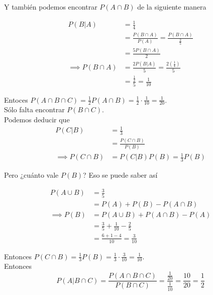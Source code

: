 \documentclass[12pt,a4paper]{report}
\begin{document}
\begin{enumerate}
{\begin{enumerate}[label=\alph*) ]
{			Y también podemos encontrar $P(A \cap B)$ de la siguiente manera

			\begin{align*}
				P(B|A) &= \frac{1}{4} \\
							 &= \frac{P(B \cap A)}{P(A)} = \frac{P(B \cap A)}{\frac{2}{5}}\\
							 &= \frac{5P(B \cap A)}{2}\\
				\implies P(B \cap A) &= \frac{2P(B|A)}{5} = \frac{2(\frac{1}{4})}{5}\\
							 &= \frac{\frac{1}{2}}{5} = \frac{1}{10}
			\end{align*}

			Entoces $P(A\cap B \cap C) = \frac{1}{2} P(A \cap B) = \frac{1}{2} \cdot \frac{1}{10} = \frac{1}{20}$.\\

			Sólo falta encontrar $P(B \cap C)$.\\

			Podemos deducir que
			\begin{align*}
				P(C|B) &= \frac{1}{3}\\
							 &= \frac{P(C \cap B)}{P(B)}\\
				\implies P(C \cap B) &= 	P(C|B) P(B) = \frac{1}{3} P(B)
			\end{align*}

			Pero ¿cuánto vale $P(B)$? Eso se puede saber así

			\begin{align*}
				P(A\cup B) &= \frac{3}{5}\\
									 &= P(A) + P(B) - P(A \cap B)\\
				\implies P(B) &= P(A\cup B) + P(A \cap B) - P(A)\\
									 &= \frac{3}{5} + \frac{1}{10} - \frac{2}{5}\\
									 &= \frac{6+1-4}{10} = \frac{3}{10}
			\end{align*}

			Entonces $P(C \cap B) = \frac{1}{3}P(B) = \frac{1}{3} \cdot \frac{3}{10} = \frac{1}{10}$.\\

			Entonces
			\begin{equation*}
				P(A|B \cap C) = \frac{P(A \cap B \cap C)}{P(B \cap C)} = \frac{\frac{1}{20}}{\frac{1}{10}}	= \frac{10}{20} = \frac{1}{2}
			\end{equation*}
		 }


\end{enumerate}}
\end{enumerate}
\end{document}
